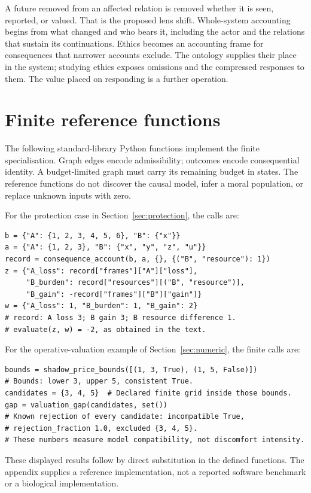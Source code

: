 \documentclass[11pt,a4paper]{article}
\theoremstyle{remark}
\begin{document}
A future removed from an affected relation is removed whether it is seen,
reported, or valued. That is the proposed lens shift. Whole-system accounting begins
from what changed and who bears it, including the actor and the relations that
sustain its continuations. Ethics becomes an accounting frame
for consequences that narrower accounts exclude. The ontology supplies their
place in the system; studying ethics exposes omissions and the compressed
responses to them. The value placed on responding is a further operation.

\appendix
\section{Finite reference functions}\label{app:functions}

The following standard-library Python functions implement the finite
specialisation. Graph edges encode admissibility; outcomes encode consequential
identity. A budget-limited graph must carry its remaining budget in states.
The reference functions do not discover the causal model, infer a moral
population, or replace unknown inputs with zero.

For the protection case in Section~\ref{sec:protection}, the calls are:
\begin{lstlisting}
b = {"A": {1, 2, 3, 4, 5, 6}, "B": {"x"}}
a = {"A": {1, 2, 3}, "B": {"x", "y", "z", "u"}}
record = consequence_account(b, a, {}, {("B", "resource"): 1})
z = {"A_loss": record["frames"]["A"]["loss"],
     "B_burden": record["resources"][("B", "resource")],
     "B_gain": -record["frames"]["B"]["gain"]}
w = {"A_loss": 1, "B_burden": 1, "B_gain": 2}
# record: A loss 3; B gain 3; B resource difference 1.
# evaluate(z, w) = -2, as obtained in the text.
\end{lstlisting}
For the operative-valuation example of Section~\ref{sec:numeric}, the finite
calls are:
\begin{lstlisting}
bounds = shadow_price_bounds([(1, 3, True), (1, 5, False)])
# Bounds: lower 3, upper 5, consistent True.
candidates = {3, 4, 5}  # Declared finite grid inside those bounds.
gap = valuation_gap(candidates, set())
# Known rejection of every candidate: incompatible True,
# rejection_fraction 1.0, excluded {3, 4, 5}.
# These numbers measure model compatibility, not discomfort intensity.
\end{lstlisting}
These displayed results follow by direct substitution in the defined functions.
The appendix supplies a reference implementation, not a reported software
benchmark or a biological implementation.
\end{document}
